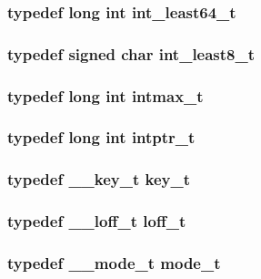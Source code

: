 \subsubsection[{int\_\-least64\_\-t}]{\setlength{\rightskip}{0pt plus 5cm}typedef long int {\bf int\_\-least64\_\-t}}\label{tp_8c_ae02ea25791501827bda6093d94a8a36c}
\subsubsection[{int\_\-least8\_\-t}]{\setlength{\rightskip}{0pt plus 5cm}typedef signed char {\bf int\_\-least8\_\-t}}\label{tp_8c_ae04fa5ea5ad475bfe428842a986fbf28}
\subsubsection[{intmax\_\-t}]{\setlength{\rightskip}{0pt plus 5cm}typedef long int {\bf intmax\_\-t}}\label{tp_8c_aa8722f97ae26d6aeff0fd4ebba7de7e4}
\subsubsection[{intptr\_\-t}]{\setlength{\rightskip}{0pt plus 5cm}typedef long int {\bf intptr\_\-t}}\label{tp_8c_a6a221854dbd5cfaa064c95d516217517}
\subsubsection[{key\_\-t}]{\setlength{\rightskip}{0pt plus 5cm}typedef {\bf \_\-\_\-key\_\-t} {\bf key\_\-t}}\label{tp_8c_ac2fa30bf00f667b1efa66370fa7b93f8}
\subsubsection[{loff\_\-t}]{\setlength{\rightskip}{0pt plus 5cm}typedef {\bf \_\-\_\-loff\_\-t} {\bf loff\_\-t}}\label{tp_8c_af6604ae5cbcfed3b916505d5a135aa60}
\subsubsection[{mode\_\-t}]{\setlength{\rightskip}{0pt plus 5cm}typedef {\bf \_\-\_\-mode\_\-t} {\bf mode\_\-t}}\label{tp_8c_ae9f148ba55d84268ecb6f8031ab45076}
